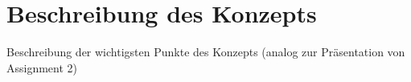 \documentclass{sigchi}
\begin{document}
\section{Beschreibung des Konzepts}
Beschreibung der wichtigsten Punkte des Konzepts (analog zur Präsentation von Assignment 2)
\end{document}
